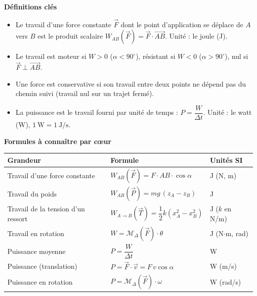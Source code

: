 \documentclass[11pt]{article}
\newcommand{\cle}[1]{{\popxbold\color{popdark}#1}}
\begin{document}
\begin{bilan}
\textbf{Définitions clés}
\begin{itemize}
\item Le \cle{travail} d'une force constante $\vec{F}$ dont le point d'application se déplace de $A$ vers $B$ est le produit scalaire $W_{AB}(\vec{F})=\vec{F}\cdot\overrightarrow{AB}$. Unité : le \cle{joule} (J).
\item Le travail est \cle{moteur} si $W>0$ ($\alpha<90^{\circ}$), \cle{résistant} si $W<0$ ($\alpha>90^{\circ}$), \cle{nul} si $\vec{F}\perp\overrightarrow{AB}$.
\item Une force est \cle{conservative} si son travail entre deux points ne dépend pas du chemin suivi (travail nul sur un trajet fermé).
\item La \cle{puissance} est le travail fourni par unité de temps : $P=\dfrac{W}{\Delta t}$. Unité : le \cle{watt} (W), $1~\mathrm{W}=1~\mathrm{J/s}$.
\end{itemize}

\textbf{Formules à connaître par c\oe ur}
\begin{center}
\begin{tabularx}{\linewidth}{|l|X|l|}
\hline
\rowcolor{popblue!40} \textbf{Grandeur} & \textbf{Formule} & \textbf{Unités SI} \\
\hline
Travail d'une force constante & $W_{AB}(\vec{F})=F\cdot AB\cdot\cos\alpha$ & J (N, m) \\
\hline
Travail du poids & $W_{AB}(\vec{P})=mg\,(z_A-z_B)$ & J \\
\hline
Travail de la tension d'un ressort & $W_{A\to B}(\vec{T})=\dfrac{1}{2}k\left(x_A^{2}-x_B^{2}\right)$ & J ($k$ en N/m) \\
\hline
Travail en rotation & $W=\mathcal{M}_{\Delta}(\vec{F})\cdot\theta$ & J (N$\cdot$m, rad) \\
\hline
Puissance moyenne & $P=\dfrac{W}{\Delta t}$ & W \\
\hline
Puissance (translation) & $P=\vec{F}\cdot\vec{v}=F\,v\cos\alpha$ & W (m/s) \\
\hline
Puissance en rotation & $P=\mathcal{M}_{\Delta}(\vec{F})\cdot\omega$ & W (rad/s) \\
\hline
\end{tabularx}
\end{center}


\end{bilan}
\end{document}

